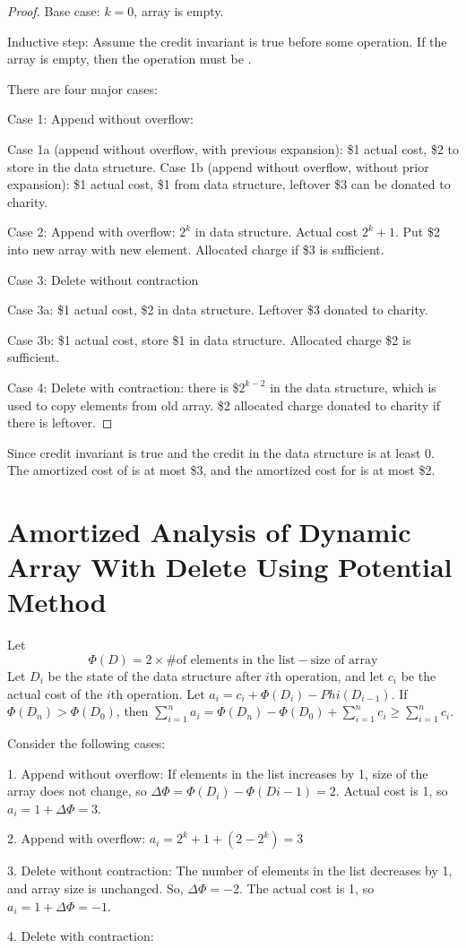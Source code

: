 \begin{proof}
    Base case: $k=0$, array is empty. 
    
    Inductive step: Assume the credit invariant is true before some operation. If the array is empty, then the operation must be .


    There are four major cases:

    Case 1: Append without overflow:

    Case 1a (append without overflow, with previous expansion): \$1 actual cost, \$2 to store in the data structure.
    Case 1b (append without overflow, without prior expansion): \$1 actual cost, \$1 from data structure, leftover \$3 can be donated to charity. %

    Case 2: Append with overflow: $2^k$ in data structure. Actual cost $2^k+1$. Put \$2 into new array with new element. Allocated charge if \$3 is sufficient.

    Case 3: Delete without contraction

    Case 3a: \$1 actual cost, \$2 in data structure. Leftover \$3 donated to charity.

    Case 3b: \$1 actual cost, store \$1 in data structure. Allocated charge \$2 is sufficient.

    Case 4: Delete with contraction: there is \$$2^{k-2}$ in the data structure, which is used to copy elements from old array. \$2 allocated charge donated to charity if there is leftover.
\end{proof}

Since credit invariant is true and the credit in the data structure is at least 0. The amortized cost of  is at most \$3, and the amortized cost for  is at most \$2.

\section{Amortized Analysis of Dynamic Array With Delete Using Potential Method}

Let
$$
\Phi(D) = 2 \times \text{\# of elements in the list} - \text{size of array}
$$
Let $D_i$ be the state of the data structure after $i$th operation, and let $c_i$ be the actual cost of the $i$th operation. Let $a_i = c_i + \Phi(D_i) - Phi(D_{i-1})$. If $\Phi(D_n) > \Phi(D_0)$, then $\sum_{i=1}^n a_i = \Phi(D_n) - \Phi(D_0) + \sum_{i=1}^n c_i \geq \sum_{i=1}^{n} c_i$.

Consider the following cases:

1. Append without overflow: If elements in the list increases by 1, size of the array does not change, so $\Delta\Phi = \Phi(D_i)-\Phi(D{i-1}) = 2$. Actual cost is 1, so $a_i = 1+\Delta\Phi = 3$.

2. Append with overflow: $a_i = 2^k + 1 + (2-2^k) = 3$%

3. Delete without contraction: The number of elements in the list decreases by 1, and array size is unchanged. So, $\Delta\Phi=-2$. The actual cost is 1, so $a_i = 1 + \Delta\Phi = -1$.

4. Delete with contraction: %